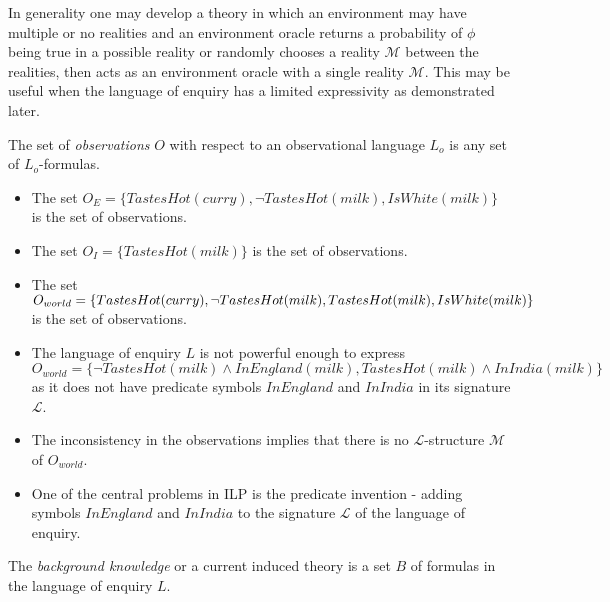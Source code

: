 \begin{remark}
In generality one may develop a theory in which an environment may have multiple or no realities and an environment oracle returns a probability of $\phi$ being true in a possible reality or randomly chooses a reality $\mathcal{M}$ between the realities, then acts as an environment oracle with a single reality $\mathcal{M}$. This may be useful when the language of enquiry has a limited expressivity as demonstrated later.
\end{remark}

\begin{defn}
The set of \emph{observations} $O$ with respect to an observational language $L_o$ is any set of $L_o$-formulas.
\end{defn}

\begin{exmp}
\begin{itemize}
\item The set $O_E=\{TastesHot(curry), \neg TastesHot(milk), IsWhite(milk)\}$ is the set of observations.
\item The set $O_I=\{TastesHot(milk)\}$ is the set of observations.
\item The set $O_{world}=\{TastesHot(curry), \neg TastesHot(milk), TastesHot(milk), \\
IsWhite(milk)\}$ is the set of observations.
\end{itemize}
\end{exmp}

\begin{remark}
\begin{itemize}
\item The language of enquiry $L$ is not powerful enough to express $O_{world}=\{\neg TastesHot(milk) \land InEngland(milk), TastesHot(milk) \land InIndia(milk)\}$
 as it does not have predicate symbols $InEngland$ and $InIndia$ in its signature $\mathcal{L}$.
\item The inconsistency in the observations implies that there is no $\mathcal{L}$-structure $\mathcal{M}$ of $O_{world}$.
\item One of the central problems in ILP is the predicate invention - adding symbols $InEngland$ and $InIndia$ to the signature $\mathcal{L}$ of the language of enquiry.
\end{itemize}
\end{remark}

\begin{defn}
The \emph{background knowledge} or a current induced theory is a set $B$ of formulas in the language of enquiry $L$.
\end{defn}

